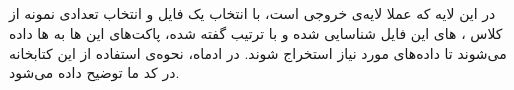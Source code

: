 \subsection{}
در این لایه که عملا لایه‌ی خروجی است، با انتخاب یک فایل  و انتخاب تعدادی نمونه از کلاس ، ‌های این فایل شناسایی شده و با ترتیب گفته شده، پاکت‌های این ‌ها به 
‌ها 
داده می‌شوند تا داده‌های مورد نیاز استخراج شوند.
در ادماه، نحوه‌ی استفاده از این کتابخانه در کد ما توضیح داده می‌شود.